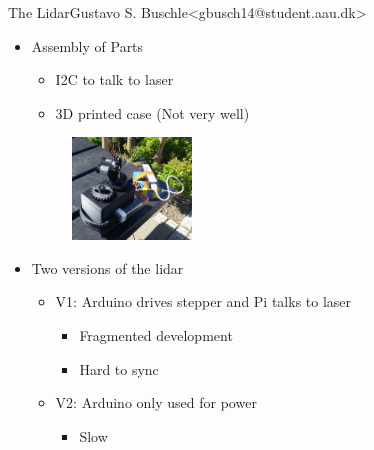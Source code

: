 \begin{frame}{The Lidar}{Gustavo S. Buschle\newline<gbusch14@student.aau.dk>}
    \begin{itemize}
        \item <1-> Assembly of Parts
            \begin{itemize}
                \item <2-> I2C to talk to laser
                \item <3-> 3D printed case (Not very well)
            \end{itemize}

        \begin{figure}[h!]
            \includegraphics[width=0.3\textwidth]{images/lidarpi.jpg}
        \end{figure}
        
        
        \item <4-> Two versions of the lidar
        \begin{itemize}
            \item <5-> V1: Arduino drives stepper and Pi talks to laser
                \begin{itemize}
                    \item <6-> Fragmented development
                    \item <7-> Hard to sync
                \end{itemize}
            \item <8-> V2: Arduino only used for power 
                \begin{itemize}
                    \item <9-> Slow
                \end{itemize}
        \end{itemize}
    \end{itemize}
\end{frame}

